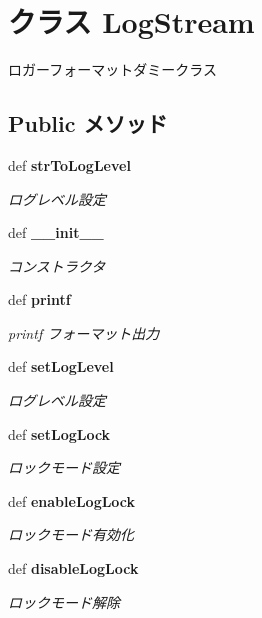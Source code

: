 \section{クラス LogStream}
\label{classsource__py_1_1_system_logger_1_1_log_stream}
ロガーフォーマットダミークラス  


\subsection*{Public メソッド}
\begin{CompactItemize}
\item 
def {\bf strToLogLevel}
\begin{CompactList}\small\item\em ログレベル設定 \item\end{CompactList}\item 
def {\bf \_\-\_\-init\_\-\_\-}
\begin{CompactList}\small\item\em コンストラクタ \item\end{CompactList}\item 
def {\bf printf}
\begin{CompactList}\small\item\em printf フォーマット出力 \item\end{CompactList}\item 
def {\bf setLogLevel}
\begin{CompactList}\small\item\em ログレベル設定 \item\end{CompactList}\item 
def {\bf setLogLock}
\begin{CompactList}\small\item\em ロックモード設定 \item\end{CompactList}\item 
def {\bf enableLogLock}
\begin{CompactList}\small\item\em ロックモード有効化 \item\end{CompactList}\item 
def {\bf disableLogLock}
\begin{CompactList}\small\item\em ロックモード解除 \item\end{CompactList}\item 

\end{CompactItemize}
